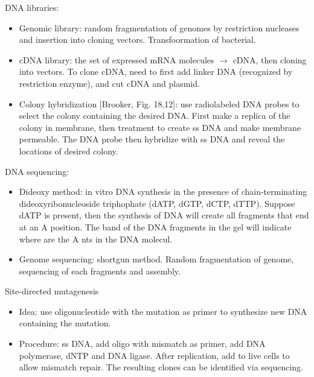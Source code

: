 \documentclass{report}
\begin{document}
DNA libraries: 
\begin{itemize}
	\item Genomic library: random fragmentation of genomes by restriction nucleases and insertion into cloning vectors. Transfoormation of bacterial. 
	
	\item cDNA library: the set of expressed mRNA molecules $\rightarrow$ cDNA, then cloning into vectors. To clone cDNA, need to first add linker DNA (recognized by restriction enzyme), and cut cDNA and plasmid.  
	
	\item Colony hybridization [Brooker, Fig. 18.12]: use radiolabeled DNA probes to select the colony containing the desired DNA. First make a replica of the colony in membrane, then treatment to create ss DNA and make membrane permeable. The DNA probe then hybridize with ss DNA and reveal the locations of desired colony. 
\end{itemize}

DNA sequencing: 
\begin{itemize}
\item Dideoxy method: in vitro DNA synthesis in the presence of chain-terminating dideoxyribonucleoside triphophate (dATP, dGTP, dCTP, dTTP). Suppose dATP is present, then the synthesis of DNA will create all fragments that end at an A position. The band of the DNA fragments in the gel will indicate where are the A nts in the DNA molecul. 
\item Genome sequencing: shortgun method. Random fragmentation of genome, sequencing of each fragments and assembly. 
\end{itemize}

Site-directed mutagenesis
\begin{itemize}
	\item Idea: use oligonucleotide with the mutation as primer to synthesize new DNA containing the mutation. 
	
	\item Procedure: ss DNA, add oligo with mismatch as primer, add DNA polymerase, dNTP and DNA ligase. After replication, add to live cells to allow mismatch repair. The resulting clones can be identified via sequencing.  
\end{itemize}
\end{document}
